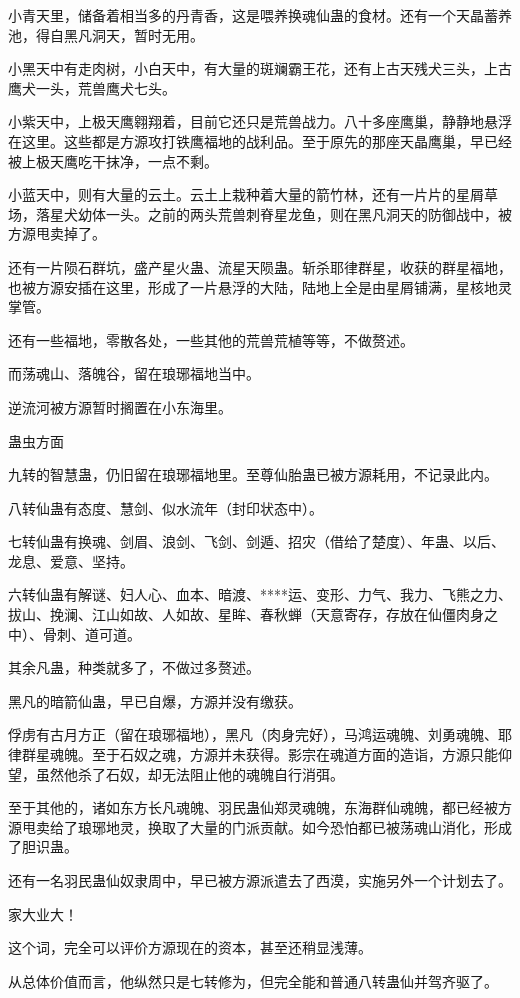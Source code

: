 \begin{this_body}
小青天里，储备着相当多的丹青香，这是喂养换魂仙蛊的食材。还有一个天晶蓄养池，得自黑凡洞天，暂时无用。

小黑天中有走肉树，小白天中，有大量的斑斓霸王花，还有上古天残犬三头，上古鹰犬一头，荒兽鹰犬七头。

小紫天中，上极天鹰翱翔着，目前它还只是荒兽战力。八十多座鹰巢，静静地悬浮在这里。这些都是方源攻打铁鹰福地的战利品。至于原先的那座天晶鹰巢，早已经被上极天鹰吃干抹净，一点不剩。

小蓝天中，则有大量的云土。云土上栽种着大量的箭竹林，还有一片片的星屑草场，落星犬幼体一头。之前的两头荒兽刺脊星龙鱼，则在黑凡洞天的防御战中，被方源甩卖掉了。

还有一片陨石群坑，盛产星火蛊、流星天陨蛊。斩杀耶律群星，收获的群星福地，也被方源安插在这里，形成了一片悬浮的大陆，陆地上全是由星屑铺满，星核地灵掌管。

还有一些福地，零散各处，一些其他的荒兽荒植等等，不做赘述。

而荡魂山、落魄谷，留在琅琊福地当中。

逆流河被方源暂时搁置在小东海里。

蛊虫方面

九转的智慧蛊，仍旧留在琅琊福地里。至尊仙胎蛊已被方源耗用，不记录此内。

八转仙蛊有态度、慧剑、似水流年（封印状态中）。

七转仙蛊有换魂、剑眉、浪剑、飞剑、剑遁、招灾（借给了楚度）、年蛊、以后、龙息、爱意、坚持。

六转仙蛊有解谜、妇人心、血本、暗渡、****运、变形、力气、我力、飞熊之力、拔山、挽澜、江山如故、人如故、星眸、春秋蝉（天意寄存，存放在仙僵肉身之中）、骨刺、道可道。

其余凡蛊，种类就多了，不做过多赘述。

黑凡的暗箭仙蛊，早已自爆，方源并没有缴获。

俘虏有古月方正（留在琅琊福地），黑凡（肉身完好），马鸿运魂魄、刘勇魂魄、耶律群星魂魄。至于石奴之魂，方源并未获得。影宗在魂道方面的造诣，方源只能仰望，虽然他杀了石奴，却无法阻止他的魂魄自行消弭。

至于其他的，诸如东方长凡魂魄、羽民蛊仙郑灵魂魄，东海群仙魂魄，都已经被方源甩卖给了琅琊地灵，换取了大量的门派贡献。如今恐怕都已被荡魂山消化，形成了胆识蛊。

还有一名羽民蛊仙奴隶周中，早已被方源派遣去了西漠，实施另外一个计划去了。

家大业大！

这个词，完全可以评价方源现在的资本，甚至还稍显浅薄。

从总体价值而言，他纵然只是七转修为，但完全能和普通八转蛊仙并驾齐驱了。


\end{this_body}
